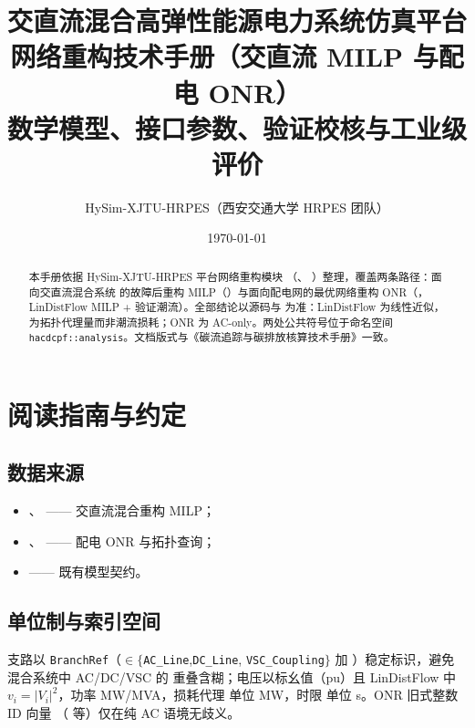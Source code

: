 \documentclass[UTF8,fontset=fandol,a4paper,11pt]{ctexart}
\title{\textbf{交直流混合高弹性能源电力系统仿真平台}\\[0.5em]
       {\Large 网络重构技术手册（交直流 MILP 与配电 ONR）}\\[0.3em]
       {\large 数学模型、接口参数、验证校核与工业级评价}}
\author{HySim-XJTU-HRPES（西安交通大学 HRPES 团队）}
\date{\today}
\begin{document}
\maketitle
\begin{abstract}
\noindent 本手册依据 HySim-XJTU-HRPES 平台网络重构模块
（、
）整理，覆盖两条路径：面向交直流混合系统
的故障后重构 MILP（）与面向配电网的最优网络重构
ONR（，LinDistFlow MILP + 验证潮流）。全部结论以源码与
 为准：LinDistFlow 为线性近似，
 为拓扑代理量而非潮流损耗；ONR 为 AC-only。两处公共符号位于命名空间
\texttt{hacdcpf::analysis}。文档版式与《碳流追踪与碳排放核算技术手册》一致。
\end{abstract}

\tableofcontents
\newpage

\section{阅读指南与约定}
\subsection{数据来源}
\begin{itemize}
  \item {}、
         —— 交直流混合重构 MILP；
  \item {}、
         —— 配电 ONR 与拓扑查询；
  \item {} —— 既有模型契约。
\end{itemize}

\subsection{单位制与索引空间}
支路以 \texttt{BranchRef}（$\in\{$\texttt{AC\_Line},\texttt{DC\_Line},
\texttt{VSC\_Coupling}$\}$ 加 ）稳定标识，避免混合系统中 AC/DC/VSC 的 
重叠含糊；电压以标幺值（pu）且 LinDistFlow 中 $v_i=|V_i|^2$，功率 MW/MVA，损耗代理
 单位 MW，时限  单位 s。ONR 旧式整数 ID 向量
（ 等）仅在纯 AC 语境无歧义。
\end{document}
